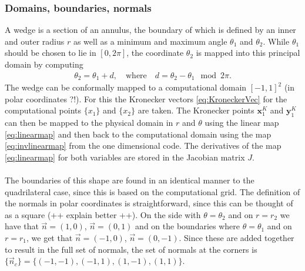 \documentclass[11pt, a4paper]{article}
\theoremstyle{definition}
\begin{document}
\subsubsection{Domains, boundaries, normals}
A wedge is a section of an annulus, the boundary of which is defined by an inner and outer radius $r$ as well as a minimum and maximum angle $\theta_1$ and $\theta_2$. While $\theta_1$ should be chosen to lie in $[0, 2 \pi]$, the coordinate $\theta_2$ is mapped into this principal domain by computing 
\begin{align*}
	\theta_2 = \theta_1 +  d, \quad \text{where} \quad d = \theta_2 - \theta_1\mod 2 \pi.
\end{align*}
The wedge can be conformally mapped to a computational domain $[-1,1]^2$ (in polar coordinates ?!). For this the Kronecker vectors \eqref{eq:KroneckerVec} for the computational points $\{x_1\}$ and $\{x_2\}$ are taken. 
The Kronecker points $\mathbf{x}_1^{K}$ and $\mathbf{y}_1^{K}$ can then be mapped to the physical domain in $r$ and $\theta$ using the linear map \eqref{eq:linearmap} and then back to the computational domain using the map \eqref{eq:invlinearmap} from the one dimensional code. The derivatives of the map \eqref{eq:linearmap} for both variables are stored in the Jacobian matrix $J$.
\\
\\
The boundaries of this shape are found in an identical manner to the quadrilateral case, since this is based on the computational grid. The definition of the normals in polar coordinates is straightforward, since this can be thought of as a square (++ explain better ++). On the side with $\theta = \theta_2$ and on $r = r_2$ we have that $\vec n = (1,0)$, $\vec n = (0,1)$ and on the boundaries where $\theta = \theta_1$ and on $r = r_1$, we get that $\vec n = (-1,0)$, $\vec n = (0,-1)$. Since these are added together to result in the full set of normals, the set of normals at the corners is $\{\vec n_c\} = \{(-1,-1), (-1,1), (1,-1), (1,1)\}$. 
\end{document}
